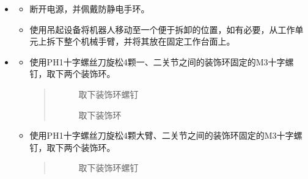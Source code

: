 \documentclass[a4paper,11pt,english,openany,oneside]{sphinxmanual}
\begin{document}
\sphinxAtStartPar
{}
\begin{itemize}
\item {} 
\sphinxAtStartPar
{}
\begin{itemize}
\item {} 
\sphinxAtStartPar
断开电源，并佩戴防静电手环。

\item {} 
\sphinxAtStartPar
使用吊起设备将机器人移动至一个便于拆卸的位置，如有必要，从工作单元上拆下整个机械手臂，并将其放在固定工作台面上。

\end{itemize}

\item {} 
\sphinxAtStartPar
{}
\begin{itemize}
\item {} 
\sphinxAtStartPar
使用PH1十字螺丝刀旋松4颗一、二关节之间的装饰环固定的M3十字螺钉，取下两个装饰环。
\begin{quote}

\begin{figure}[H]
\centering
\capstart

\noindent{}
\caption{取下装饰环螺钉}\label{\detokenize{_u66f4_u6362_u5173_u8282:id110}}\end{figure}

\begin{figure}[H]
\centering
\capstart

\noindent{}
\caption{取下装饰环}\label{\detokenize{_u66f4_u6362_u5173_u8282:id111}}\end{figure}
\end{quote}

\item {} 
\sphinxAtStartPar
使用PH1十字螺丝刀旋松4颗大臂、二关节之间的装饰环固定的M3十字螺钉，取下两个装饰环。
\begin{quote}

\begin{figure}[H]
\centering
\capstart

\noindent{}
\caption{取下装饰环螺钉}\label{\detokenize{_u66f4_u6362_u5173_u8282:id112}}\end{figure}

\begin{figure}[H]
\centering
\capstart


\end{figure}
\end{quote}
\end{itemize}
\end{itemize}
\end{document}
